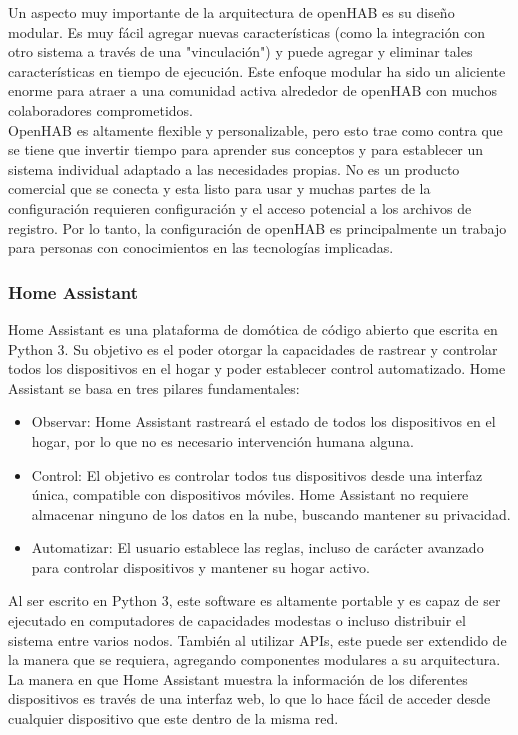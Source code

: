 Un aspecto muy importante de la arquitectura de openHAB es su diseño modular. Es muy fácil agregar nuevas características (como la integración con otro sistema a través de una "vinculación") y puede agregar y eliminar tales características en tiempo de ejecución. Este enfoque modular ha sido un aliciente enorme para atraer a una comunidad activa alrededor de openHAB con muchos colaboradores comprometidos.\\

OpenHAB es altamente flexible y personalizable, pero esto trae como contra que se tiene que invertir tiempo para aprender sus conceptos y para establecer un sistema individual adaptado a las necesidades propias. No es un producto comercial que se conecta y esta listo para usar y muchas partes de la configuración requieren configuración y el acceso potencial a los archivos de registro. Por lo tanto, la configuración de openHAB es principalmente un trabajo para personas con conocimientos en las tecnologías implicadas. \cite{openhab2}

\subsubsection{Home Assistant}
Home Assistant es una plataforma de domótica de código abierto que escrita en Python 3. Su objetivo es el poder otorgar la capacidades de rastrear y controlar todos los dispositivos en el hogar y poder establecer control automatizado. \cite{homeAssistant} Home Assistant se basa en tres pilares fundamentales:

\begin{itemize}
\item Observar: Home Assistant rastreará el estado de todos los dispositivos en el hogar, por lo que no es necesario intervención humana alguna.
\item Control: El objetivo es controlar todos tus dispositivos desde una interfaz única, compatible con dispositivos móviles. Home Assistant no requiere almacenar ninguno de los datos en la nube, buscando mantener su privacidad.
\item Automatizar: El usuario establece las reglas, incluso de carácter avanzado para controlar dispositivos y mantener su hogar activo.
\end{itemize}

Al ser escrito en Python 3, este software es altamente portable y es capaz de ser ejecutado en computadores de capacidades modestas o incluso distribuir el sistema entre varios nodos. También al utilizar APIs, este puede ser extendido de la manera que se requiera, agregando componentes modulares a su arquitectura. La manera en que Home Assistant muestra la información de los diferentes dispositivos es través de una interfaz web, lo que lo hace fácil de acceder desde cualquier dispositivo que este dentro de la misma red.\\

